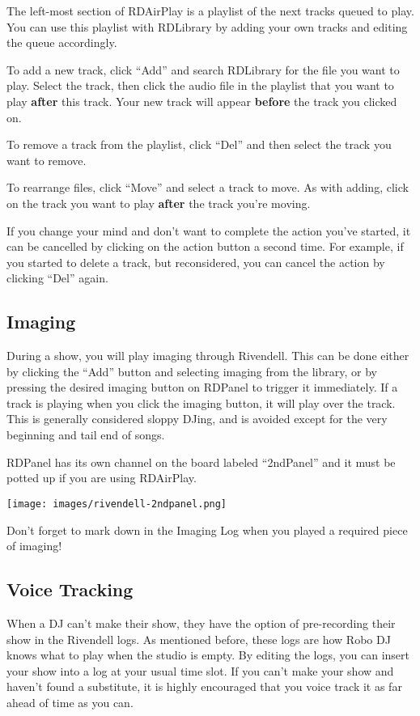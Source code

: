 \documentclass{witrman}
\begin{document}
The left-most section of RDAirPlay is a playlist of the next tracks queued to
play.  You can use this playlist with RDLibrary by adding your own tracks and
editing the queue accordingly.

To add a new track, click ``Add'' and search RDLibrary for the file you want to
play.  Select the track, then click the audio file in the playlist that you want
to play \textbf{after} this track.  Your new track will appear \textbf{before} 
the track you clicked on.

To remove a track from the playlist, click ``Del'' and then select the track you
want to remove.

To rearrange files, click ``Move'' and select a track to move.  As with adding,
click on the track you want to play \textbf{after} the track you're moving.

If you change your mind and don't want to complete the action you've started, it
can be cancelled by clicking on the action button a second time.  For example,
if you started to delete a track, but reconsidered, you can cancel the action by
clicking ``Del'' again.

\subsection{Imaging}

During a show, you will play imaging through Rivendell.  This can be done either
by clicking the ``Add'' button and selecting imaging from the library, or by
pressing the desired imaging button on RDPanel to trigger it immediately.
If a track is playing when you click the imaging button, it will play over the
track.  This is generally considered sloppy DJing, and is avoided except for the
very beginning and tail end of songs.

RDPanel has its own channel on the board labeled
``2ndPanel'' and it must be potted up if you are using RDAirPlay.

\texttt{[image: images/rivendell-2ndpanel.png]}

Don't forget to mark down in the Imaging Log when you played a required
piece of imaging!

\subsection{Voice Tracking}

When a DJ can't make their show, they have the option of pre-recording their
show in the Rivendell logs.  As mentioned before, these logs are how Robo DJ
knows what to play when the studio is empty. By editing the logs, you can insert
your show into a log at your usual time slot.  If you can't make your show and
haven't found a substitute, it is highly encouraged that you voice track it as
far ahead of time as you can.
\end{document}
